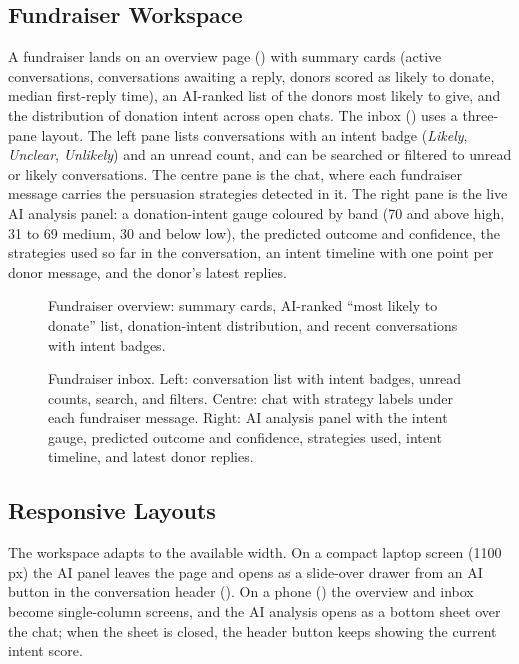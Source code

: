 \subsection{Fundraiser Workspace}
A fundraiser lands on an overview page () with summary cards (active conversations, conversations awaiting a reply, donors scored as likely to donate, median first-reply time), an AI-ranked list of the donors most likely to give, and the distribution of donation intent across open chats. The inbox () uses a three-pane layout. The left pane lists conversations with an intent badge (\emph{Likely}, \emph{Unclear}, \emph{Unlikely}) and an unread count, and can be searched or filtered to unread or likely conversations. The centre pane is the chat, where each fundraiser message carries the persuasion strategies detected in it. The right pane is the live AI analysis panel: a donation-intent gauge coloured by band (70 and above high, 31 to 69 medium, 30 and below low), the predicted outcome and confidence, the strategies used so far in the conversation, an intent timeline with one point per donor message, and the donor's latest replies.

\begin{figure}[htbp]
  \centering
  \caption{Fundraiser overview: summary cards, AI-ranked ``most likely to donate'' list, donation-intent distribution, and recent conversations with intent badges.}
  \label{fig:ui-overview}
\end{figure}

\begin{figure}[htbp]
  \centering
  \caption{Fundraiser inbox. Left: conversation list with intent badges, unread counts, search, and filters. Centre: chat with strategy labels under each fundraiser message. Right: AI analysis panel with the intent gauge, predicted outcome and confidence, strategies used, intent timeline, and latest donor replies.}
  \label{fig:ui-inbox}
\end{figure}

\subsection{Responsive Layouts}
The workspace adapts to the available width. On a compact laptop screen (1100\,px) the AI panel leaves the page and opens as a slide-over drawer from an AI button in the conversation header (). On a phone () the overview and inbox become single-column screens, and the AI analysis opens as a bottom sheet over the chat; when the sheet is closed, the header button keeps showing the current intent score.

